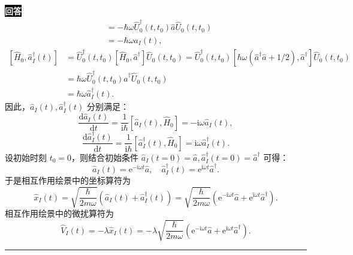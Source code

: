 \documentclass[11pt,a4paper]{ctexart}
\newenvironment{answer}
  {\par\smallskip\noindent
   \begingroup
   \setlength{\fboxsep}{4pt}%
   \colorbox{black}{\textcolor{white}{\bfseries 回答}}%
   \endgroup
   \quad\ignorespaces}
  {\par\smallskip\noindent\rule{\linewidth}{0.4pt}\medskip}
\begin{document}
\begin{answer}
\begin{equation}
\begin{aligned}
      &=-\hbar\omega \hat{U}_0^\dag(t,t_0) \hat{a} \hat{U}_0(t,t_0) \\
      &=-\hbar\omega \hat{a}_I(t),
    \end{aligned}
  \end{equation}
  \begin{equation}
    \begin{aligned}
      \left[\hat{H}_0,\hat{a}_I^\dag(t) \right]
      &=\hat{U}_0^\dag(t,t_0) \left[\hat{H}_0,\hat{a}^\dag \right] \hat{U}_0(t,t_0)
      =\hat{U}_0^\dag(t,t_0) \left[\hbar\omega\left(\hat{a}^\dag\hat{a}+1/2 \right),\hat{a}^\dag \right] \hat{U}_0(t,t_0) \\
      &=\hbar\omega \hat{U}_0^\dag(t,t_0) \hat{a}^\dag \hat{U}_0(t,t_0) \\
      &=\hbar\omega \hat{a}_I^\dag(t).
    \end{aligned}
  \end{equation}
  因此，$\hat{a}_I(t),\hat{a}_I^\dag(t) $ 分别满足：
  \begin{equation}
    \frac{\mathrm{d}\hat{a}_I(t) }{\mathrm{d}t }
    =\frac{1 }{\mathrm{i}\hbar } \left[\hat{a}_I(t),\hat{H}_0 \right] 
    =-\mathrm{i}\omega \hat{a}_I(t),
  \end{equation}
  \begin{equation}
    \frac{\mathrm{d}\hat{a}_I^\dag(t) }{\mathrm{d}t }
    =\frac{1 }{\mathrm{i}\hbar } \left[\hat{a}_I^\dag(t),\hat{H}_0 \right] 
    =\mathrm{i}\omega\hat{a}^\dag_I(t).
  \end{equation}
  设初始时刻 $t_0=0 $，则结合初始条件 $\hat{a}_I(t=0)=\hat{a},\hat{a}_I^\dag(t=0)=\hat{a}^\dag $ 可得：
  \begin{equation}
    \hat{a}_I(t)
    =\mathrm{e}^{-\mathrm{i}\omega t}\hat{a},\quad
    \hat{a}_I^\dag(t)
    =\mathrm{e}^{\mathrm{i}\omega t}\hat{a}^\dag.
  \end{equation}
  于是相互作用绘景中的坐标算符为
  \begin{equation}
    \hat{x}_I(t)
    =\sqrt{\frac{\hbar }{2m\omega } }\left(\hat{a}_I(t)+\hat{a}^\dag_I(t) \right)
    =\sqrt{\frac{\hbar }{2m\omega } } \left(\mathrm{e}^{-\mathrm{i}\omega t}\hat{a} + \mathrm{e}^{\mathrm{i}\omega t}\hat{a}^\dag \right).
  \end{equation}
  相互作用绘景中的微扰算符为
  \begin{equation}
    \hat{V}_I(t)
    =-\lambda\hat{x}_I(t)
    =-\lambda \sqrt{\frac{\hbar }{2m\omega } } \left(\mathrm{e}^{-\mathrm{i}\omega t}\hat{a} + \mathrm{e}^{\mathrm{i}\omega t}\hat{a}^\dag \right).
  \end{equation}

\end{answer}
\end{document}
